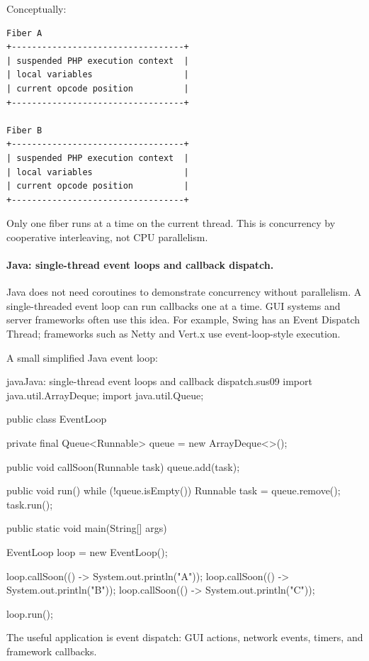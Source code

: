 Conceptually:

\begin{verbatim}
Fiber A
+----------------------------------+
| suspended PHP execution context  |
| local variables                  |
| current opcode position          |
+----------------------------------+

Fiber B
+----------------------------------+
| suspended PHP execution context  |
| local variables                  |
| current opcode position          |
+----------------------------------+
\end{verbatim}

Only one fiber runs at a time on the current thread. This is concurrency by cooperative interleaving, not CPU parallelism.

\paragraph{Java: single-thread event loops and callback dispatch.}

Java does not need coroutines to demonstrate concurrency without parallelism. A single-threaded event loop can run callbacks one at a time. GUI systems and server frameworks often use this idea. For example, Swing has an Event Dispatch Thread; frameworks such as Netty and Vert.x use event-loop-style execution.

A small simplified Java event loop:

\begin{codebox}[]{java}{Java: single-thread event loops and callback dispatch.}{sus09}
import java.util.ArrayDeque;
import java.util.Queue;

public class EventLoop {
    private final Queue<Runnable> queue = new ArrayDeque<>();

    public void callSoon(Runnable task) {
        queue.add(task);
    }

    public void run() {
        while (!queue.isEmpty()) {
            Runnable task = queue.remove();
            task.run();
        }
    }

    public static void main(String[] args) {
        EventLoop loop = new EventLoop();

        loop.callSoon(() -> System.out.println("A"));
        loop.callSoon(() -> System.out.println("B"));
        loop.callSoon(() -> System.out.println("C"));

        loop.run();
    }
}
\end{codebox}


The useful application is event dispatch: GUI actions, network events, timers, and framework callbacks.


